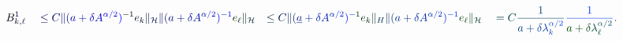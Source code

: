 \documentclass[12pt]{article}
\begin{document}
\makeatletter
\renewcommand*{\@textcolor}[3]{%
  \protect\leavevmode
  \begingroup
    \color#1{#2}#3%
  \endgroup
}
\makeatother
\begin{displaymath}
\begin{array} {rlrl} \displaystyle { \mathcolor[RGB]{0,0,15}{B} _ { \mathcolor[RGB]{0,0,30}{k} \mathcolor[RGB]{0,0,45}{,} \mathcolor[RGB]{0,0,60}{\ell} } ^ { \mathcolor[RGB]{0,0,75}{1} } } & \displaystyle { { } \mathcolor[RGB]{0,0,90}{\leq} \mathcolor[RGB]{0,0,105}{C} \mathcolor[RGB]{0,0,120}{\|} \mathcolor[RGB]{0,0,135}{(} \mathcolor[RGB]{0,0,150}{a} \mathcolor[RGB]{0,0,165}{+} \mathcolor[RGB]{0,0,180}{\delta} \mathcolor[RGB]{0,0,195}{A} ^ { \mathcolor[RGB]{0,0,210}{\alpha} \mathcolor[RGB]{0,0,225}{/} \mathcolor[RGB]{0,0,240}{2} } \mathcolor[RGB]{0,0,255}{)} ^ { \mathcolor[RGB]{0,15,0}{-} \mathcolor[RGB]{0,15,15}{1} } \mathcolor[RGB]{0,15,30}{e} _ { \mathcolor[RGB]{0,15,45}{k} } \mathcolor[RGB]{0,15,60}{\|} _ { \mathcal { \mathcolor[RGB]{0,15,75}{H} } } \mathcolor[RGB]{0,15,90}{\|} \mathcolor[RGB]{0,15,105}{(} \mathcolor[RGB]{0,15,120}{a} \mathcolor[RGB]{0,15,135}{+} \mathcolor[RGB]{0,15,150}{\delta} \mathcolor[RGB]{0,15,165}{A} ^ { \mathcolor[RGB]{0,15,180}{\alpha} \mathcolor[RGB]{0,15,195}{/} \mathcolor[RGB]{0,15,210}{2} } \mathcolor[RGB]{0,15,225}{)} ^ { \mathcolor[RGB]{0,15,240}{-} \mathcolor[RGB]{0,15,255}{1} } \mathcolor[RGB]{0,30,0}{e} _ { \mathcolor[RGB]{0,30,15}{\ell} } \mathcolor[RGB]{0,30,30}{\|} _ { \mathcal { \mathcolor[RGB]{0,30,45}{H} } } } & \displaystyle { \mathcolor[RGB]{0,30,60}{\leq} \mathcolor[RGB]{0,30,75}{C} \mathcolor[RGB]{0,30,90}{\|} \mathcolor[RGB]{0,30,105}{(} \mathcolor[RGB]{0,30,120}{\underline { \mathcolor[RGB]{0,30,135}{a} } } \mathcolor[RGB]{0,30,150}{+} \mathcolor[RGB]{0,30,165}{\delta} \mathcolor[RGB]{0,30,180}{A} ^ { \mathcolor[RGB]{0,30,195}{\alpha} \mathcolor[RGB]{0,30,210}{/} \mathcolor[RGB]{0,30,225}{2} } \mathcolor[RGB]{0,30,240}{)} ^ { \mathcolor[RGB]{0,30,255}{-} \mathcolor[RGB]{0,45,0}{1} } \mathcolor[RGB]{0,45,15}{e} _ { \mathcolor[RGB]{0,45,30}{k} } \mathcolor[RGB]{0,45,45}{\|} _ { \mathcolor[RGB]{0,45,60}{\mathscr} { \mathcolor[RGB]{0,45,75}{H} } } \mathcolor[RGB]{0,45,90}{\|} \mathcolor[RGB]{0,45,105}{(} \mathcolor[RGB]{0,45,120}{a} \mathcolor[RGB]{0,45,135}{+} \mathcolor[RGB]{0,45,150}{\delta} \mathcolor[RGB]{0,45,165}{A} ^ { \mathcolor[RGB]{0,45,180}{\alpha} \mathcolor[RGB]{0,45,195}{/} \mathcolor[RGB]{0,45,210}{2} } \mathcolor[RGB]{0,45,225}{)} ^ { \mathcolor[RGB]{0,45,240}{-} \mathcolor[RGB]{0,45,255}{1} } \mathcolor[RGB]{0,60,0}{e} _ { \mathcolor[RGB]{0,60,15}{\ell} } \mathcolor[RGB]{0,60,30}{\|} _ { \mathcal { \mathcolor[RGB]{0,60,45}{H} } } } & \displaystyle { { } \mathcolor[RGB]{0,60,60}{=} \mathcolor[RGB]{0,60,75}{C} \mathcolor[RGB]{0,60,90}{\frac { \mathcolor[RGB]{0,60,105}{1} } { \mathcolor[RGB]{0,60,120}{a} \mathcolor[RGB]{0,60,135}{+} \mathcolor[RGB]{0,60,150}{\delta} \mathcolor[RGB]{0,60,165}{\lambda} _ { \mathcolor[RGB]{0,60,180}{k} } ^ { \mathcolor[RGB]{0,60,195}{\alpha} \mathcolor[RGB]{0,60,210}{/} \mathcolor[RGB]{0,60,225}{2} } } } \mathcolor[RGB]{0,60,240}{\frac { \mathcolor[RGB]{0,60,255}{1} } { \mathcolor[RGB]{0,75,0}{a} \mathcolor[RGB]{0,75,15}{+} \mathcolor[RGB]{0,75,30}{\delta} \mathcolor[RGB]{0,75,45}{\lambda} _ { \mathcolor[RGB]{0,75,60}{\ell} } ^ { \mathcolor[RGB]{0,75,75}{\alpha} \mathcolor[RGB]{0,75,90}{/} \mathcolor[RGB]{0,75,105}{2} } } } \mathcolor[RGB]{0,75,120}{.} } \end{array}
\end{displaymath}
\end{document}
